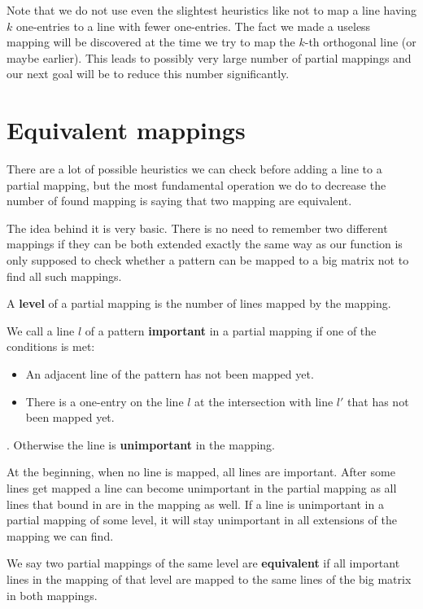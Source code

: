 Note that we do not use even the slightest heuristics like not to map a line having $k$ one-entries to a line with fewer one-entries. The fact we made a useless mapping will be discovered at the time we try to map the $k$-th orthogonal line (or maybe earlier). This leads to possibly very large number of partial mappings and our next goal will be to reduce this number significantly.

\section{Equivalent mappings}
There are a lot of possible heuristics we can check before adding a line to a partial mapping, but the most fundamental operation we do to decrease the number of found mapping is saying that two mapping are equivalent.

The idea behind it is very basic. There is no need to remember two different mappings if they can be both extended exactly the same way as our function is only supposed to check whether a pattern can be mapped to a big matrix not to find all such mappings.

A \textbf{level} of a partial mapping is the number of lines mapped by the mapping.

We call a line $l$ of a pattern \textbf{important} in a partial mapping if one of the conditions is met:
\begin{itemize}
\item An adjacent line of the pattern has not been mapped yet.
\item There is a one-entry on the line $l$ at the intersection with line $l'$ that has not been mapped yet.
\end{itemize}.
Otherwise the line is \textbf{unimportant} in the mapping.

At the beginning, when no line is mapped, all lines are important. After some lines get mapped a line can become unimportant in the partial mapping as all lines that bound in are in the mapping as well. If a line is unimportant in a partial mapping of some level, it will stay unimportant in all extensions of the mapping we can find.

We say two partial mappings of the same level are \textbf{equivalent} if all important lines in the mapping of that level are mapped to the same lines of the big matrix in both mappings.

